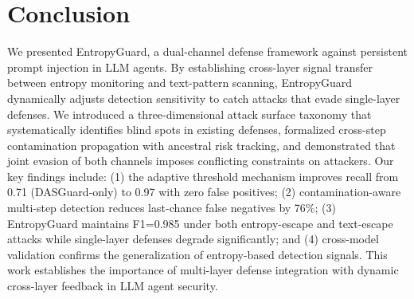 \documentclass[conference]{IEEEtran}
\begin{document}
\section{Conclusion}
\label{sec:conclusion}

We presented EntropyGuard, a dual-channel defense framework against persistent prompt injection in LLM agents. By establishing cross-layer signal transfer between entropy monitoring and text-pattern scanning, EntropyGuard dynamically adjusts detection sensitivity to catch attacks that evade single-layer defenses. We introduced a three-dimensional attack surface taxonomy that systematically identifies blind spots in existing defenses, formalized cross-step contamination propagation with ancestral risk tracking, and demonstrated that joint evasion of both channels imposes conflicting constraints on attackers. Our key findings include: (1) the adaptive threshold mechanism improves recall from 0.71 (DASGuard-only) to 0.97 with zero false positives; (2) contamination-aware multi-step detection reduces last-chance false negatives by 76\%; (3) EntropyGuard maintains F1=0.985 under both entropy-escape and text-escape attacks while single-layer defenses degrade significantly; and (4) cross-model validation confirms the generalization of entropy-based detection signals. This work establishes the importance of multi-layer defense integration with dynamic cross-layer feedback in LLM agent security.
\end{document}
